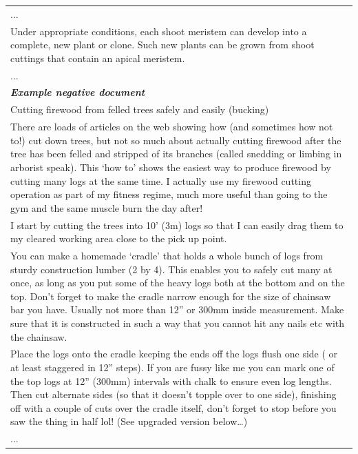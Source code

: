 \begin{table}[ht]
\begin{tabular}{p{13cm}}
... \\
Under appropriate conditions, each shoot meristem can develop into a complete, new plant or clone. Such new plants can be grown from shoot cuttings that contain an apical meristem. \\
... \\
\midrule
\textit{\textbf{Example negative document}} \\
\midrule
Cutting firewood from felled trees safely and easily (bucking) \\
There are loads of articles on the web showing how (and sometimes how not to!) cut down trees, but not so much about actually cutting firewood after the tree has been felled and stripped of its branches (called snedding or limbing in arborist speak). This ‘how to’ shows the easiest way to produce firewood by cutting many logs at the same time. I actually use my firewood cutting operation as part of my fitness regime, much more useful than going to the gym and the same muscle burn the day after! \\
I start by cutting the trees into 10’ (3m) logs so that I can easily drag them to my cleared working area close to the pick up point. \\
You can make a homemade ‘cradle’ that holds a whole bunch of logs from sturdy construction lumber (2 by 4). This enables you to safely cut many at once, as long as you put some of the heavy logs both at the bottom and on the top. Don’t forget to make the cradle narrow enough for the size of chainsaw bar you have. Usually not more than 12” or 300mm inside measurement. Make sure that it is constructed in such a way that you cannot hit any nails etc with the chainsaw. \\
Place the logs onto the cradle keeping the ends off the logs flush one side ( or at least staggered in 12” steps). If you are fussy like me you can mark one of the top logs at 12” (300mm) intervals with chalk to ensure even log lengths. Then cut alternate sides (so that it doesn’t topple over to one side), finishing off with a couple of cuts over the cradle itself, don’t forget to stop before you saw the thing in half lol! (See upgraded version below…) \\
... \\
\bottomrule
\end{tabular}
\label{tab:biology_example}
\end{table}